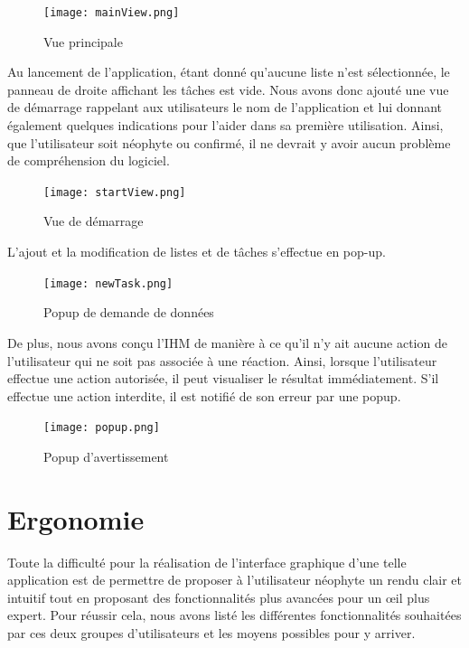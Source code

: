 		\begin{figure}[h!]
			\centering
			\texttt{[image: mainView.png]}
			\caption{Vue principale}
		\end{figure}
		\FloatBarrier
		
		Au lancement de l'application, étant donné qu'aucune liste n'est sélectionnée, le panneau de droite affichant les tâches est vide. Nous avons donc ajouté une vue de démarrage rappelant aux utilisateurs le nom de l'application et lui donnant également quelques indications pour l'aider dans sa première utilisation. Ainsi, que l'utilisateur soit néophyte ou confirmé, il ne devrait y avoir aucun problème de compréhension du logiciel.
		
		\begin{figure}[h!]
			\centering
			\texttt{[image: startView.png]}
			\caption{Vue de démarrage}
		\end{figure}
		\FloatBarrier
		
		L'ajout et la modification de listes et de tâches s'effectue en pop-up.
		
		\begin{figure}[h!]
			\centering
		 	\texttt{[image: newTask.png]}
			\caption{Popup de demande de données}
		\end{figure}
		\FloatBarrier
		
		
		De plus, nous avons conçu l'IHM de manière à ce qu'il n'y ait aucune action de l'utilisateur qui ne soit pas associée à une réaction. Ainsi, lorsque l'utilisateur effectue une action autorisée, il peut visualiser le résultat immédiatement. S'il effectue une action interdite, il est notifié de son erreur par une popup.
		
		\begin{figure}[h!]
			\centering
		   \texttt{[image: popup.png]}
		   \caption{Popup d'avertissement}
		\end{figure}
		\FloatBarrier
		
	
	\section{Ergonomie}
		Toute la difficulté pour la réalisation de l'interface graphique d'une telle application est de permettre de proposer à l'utilisateur néophyte un rendu clair et intuitif tout en proposant des fonctionnalités plus avancées pour un {\oe}il plus expert. Pour réussir cela, nous avons listé les différentes fonctionnalités souhaitées par ces deux groupes d'utilisateurs et les moyens possibles pour y arriver.
		

